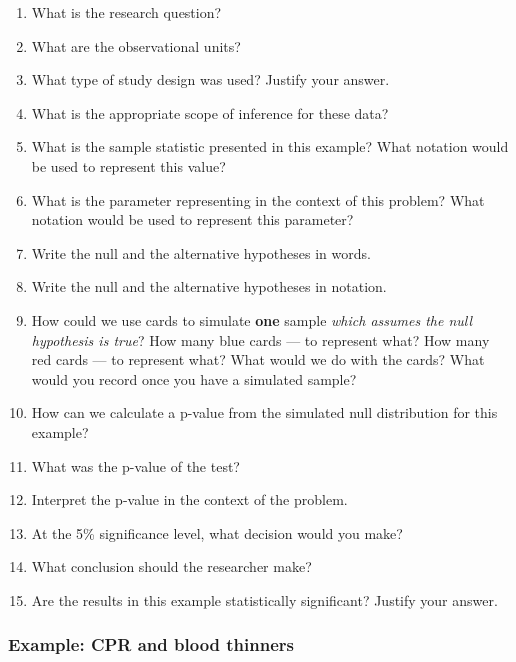 \documentclass[
]{report}
\newcommand{\rgs}{\vspace{12pt}} %
\begin{document}
\begin{enumerate}
\def\labelenumi{\arabic{enumi}.}
\item
  What is the research question?
  \rgs
\item
  What are the observational units?
  \rgs
\item
  What type of study design was used? Justify your answer.
  \rgs
\item
  What is the appropriate scope of inference for these data?
  \rgs
\item
  What is the sample statistic presented in this example? What notation would be used to represent this value?
  \rgs
\item
  What is the parameter representing in the context of this problem? What notation would be used to represent this parameter?
  \rgs
  \rgs
\item
  Write the null and the alternative hypotheses in words.
  \rgs
  \rgs
\item
  Write the null and the alternative hypotheses in notation.
  \rgs
\item
  How could we use cards to simulate \textbf{one} sample \emph{which assumes the null hypothesis is true}? How many blue cards --- to represent what? How many red cards --- to represent what? What would we do with the cards? What would you record once you have a simulated sample?
  \rgs
  \rgs
  \rgs
\item
  How can we calculate a p-value from the simulated null distribution for this example?
  \rgs
  \rgs
\item
  What was the p-value of the test?
  \rgs
\item
  Interpret the p-value in the context of the problem.
  \rgs
  \rgs
\item
  At the 5\% significance level, what decision would you make?
  \rgs
\item
  What conclusion should the researcher make?
  \rgs
\item
  Are the results in this example statistically significant? Justify your answer.
  \rgs
\end{enumerate}

\hypertarget{example-cpr-and-blood-thinners}{%
\subsubsection*{Example: CPR and blood thinners}\label{example-cpr-and-blood-thinners}}
\end{document}
